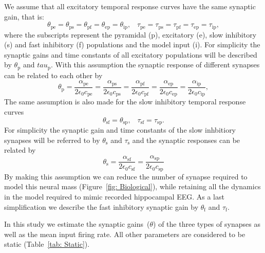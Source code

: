 We assume that all excitatory temporal response curves have the same synaptic gain, that is:
\begin{equation}\label{eq:ExcSynapse}
    \theta_{\mathrm{pe}} = \theta_{\mathrm{ps}} = \theta_{\mathrm{pf}} = \theta_{\mathrm{ep}} = \theta_{\mathrm{ip}},\,\,\,\,\, \tau_{\mathrm{pe}} = \tau_{\mathrm{ps}} = \tau_{\mathrm{pf}} = \tau_{\mathrm{ep}} = \tau_{\mathrm{ip}},
\end{equation} where the subscripts represent the pyramidal (p), excitatory (e), slow inhibitory (s) and fast inhibitory (f) populations and the model input (i). For simplicity the synaptic gains and time constants of all excitatory populations will be described by $\theta_{\mathrm{p}}$ and $tau_{\mathrm{p}}$. With this assumption the synaptic response of different synapses can be related to each other by
\begin{equation}\label{eq:ExcSynapseResp}
    \theta_{\mathrm{p}} = \frac{\alpha_{\mathrm{pe}}}{2\epsilon_{0}c_{\mathrm{pe}}}=\frac{\alpha_{\mathrm{ps}}}{2\epsilon_{0}c_{\mathrm{ps}}}=\frac{\alpha_{\mathrm{pf}}}{2\epsilon_{0}c_{\mathrm{pf}}}=\frac{\alpha_{\mathrm{ep}}}{2\epsilon_{0}c_{\mathrm{ep}}}=\frac{\alpha_{\mathrm{ip}}}{2\epsilon_{0}c_{\mathrm{ip}}},
\end{equation} 
 The same assumption is also made for the slow inhibitory temporal response curves
		\begin{equation}\label{eq:InhSynapse}
		\theta_{\mathrm{sf}} = \theta_{\mathrm{sp}},\,\,\,\,\, \tau_{\mathrm{sf}} = \tau_{\mathrm{sp}}.
\end{equation} For simplicity the synaptic gain and time constants of the slow inhbitiory synapses will be referred to by $\theta_{\mathrm{s}}$ and $\tau_{\mathrm{s}}$ and the synaptic responses can be related by
 \begin{equation}\label{eq:InhSynapseResp}
    \theta_{\mathrm{s}} = \frac{\alpha_{\mathrm{sf}}}{2\epsilon_{0}c_{\mathrm{sf}}}=\frac{\alpha_{\mathrm{sp}}}{2\epsilon_{0}c_{\mathrm{sp}}}
\end{equation} 
By making this assumption we can reduce the number of synapse required to model this neural mass (Figure~\ref{fig: Biological}), while retaining all the dynamics in the model required to mimic recorded hippocampal EEG. As a last simplification we describe the fast inhibitory synaptic gain by $\theta_{\mathrm{f}}$ and $\tau_{\mathrm{f}}$. 

In this study we estimate the synaptic gains~($\theta$) of the three types of synapses as well as the mean input firing rate. All other parameters are considered to be static (Table~\ref{tab: Static}).

